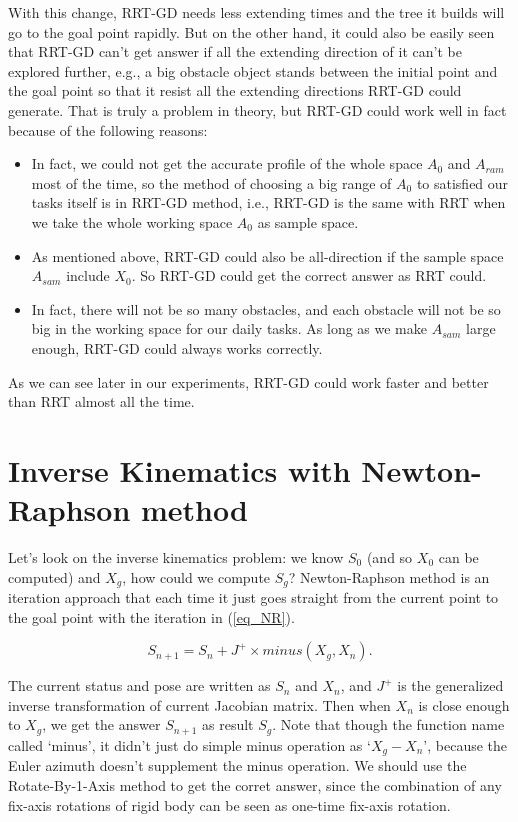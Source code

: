 \documentclass[letterpaper, 10 pt, conference]{ieeeconf}  %
\begin{document}
With this change, RRT-GD needs less extending times and the tree it builds will go to the goal point rapidly. But on the other hand, it could also be easily seen that RRT-GD can't get answer if all the extending direction of it can't be explored further, e.g., a big obstacle object stands between the initial point and the goal point so that it resist all the extending directions RRT-GD could generate. That is truly a problem in theory, but RRT-GD could work well in fact because of the following reasons:

\begin{itemize}

\item In fact, we could not get the accurate profile of the whole space $A_{0}$ and $A_{ram}$ most of the time, so the method of choosing a big range of $A_{0}$ to satisfied our tasks itself is in RRT-GD method, i.e., RRT-GD is the same with RRT when we take the whole working space $A_{0}$ as sample space.
\item  As mentioned above, RRT-GD could also be all-direction if the sample space $A_{sam}$ include $X_{0}$. So RRT-GD could get the correct answer as RRT could.
\item In fact, there will not be so many obstacles, and each obstacle will not be so big in the working space for our daily tasks. As long as we make $A_{sam}$ large enough, RRT-GD could always works correctly.  

\end{itemize} 

As we can see later in our experiments, RRT-GD could work faster and better than RRT almost all the time.

\section{Inverse Kinematics with Newton-Raphson method}

Let's look on the inverse kinematics problem: we know $S_{0}$ (and so $X_{0}$ can be computed) and $X_{g}$, how could we compute $S_{g}$? Newton-Raphson method is an iteration approach that each time it just goes straight from the current point to the goal point with the iteration in (\ref{eq_NR}).

\begin{equation}\label{eq_NR}
S_{n+1} = S_{n} + J^{+} \times minus(X_{g}, X_{n}).
\end{equation}

The current status and pose are written as $S_{n}$ and $X_{n}$, and $J^{+}$ is the generalized inverse transformation of current Jacobian matrix. Then when $X_{n}$ is close enough to $X_{g}$, we get the answer $S_{n+1}$ as result $S_{g}$. Note that though the function name called `minus', it didn't just do simple minus operation as `$X_{g} - X_{n}$', because the Euler azimuth doesn't supplement the minus operation. We should use the Rotate-By-1-Axis method to get the corret answer, since the combination of any fix-axis rotations of rigid body can be seen as one-time fix-axis rotation.
\end{document}
